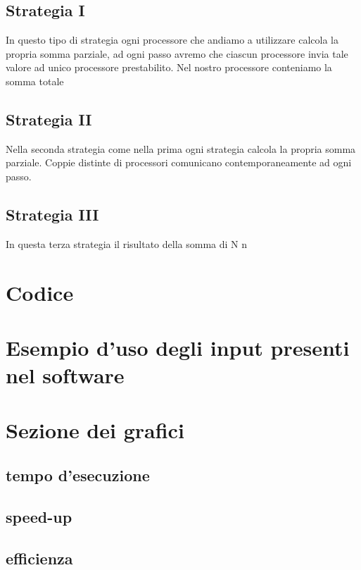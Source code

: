 \documentclass[a4paper,12pt]{article}
\begin{document}
\subsection{Strategia I}

In questo tipo di strategia ogni processore che andiamo a utilizzare calcola la propria somma parziale, ad ogni passo  avremo che ciascun processore invia tale valore ad unico processore prestabilito. Nel nostro processore conteniamo la somma totale

\subsection{Strategia II}

Nella seconda strategia come nella prima ogni strategia calcola la propria somma parziale. Coppie distinte di processori comunicano contemporaneamente ad ogni passo. 


\subsection{Strategia III}

In questa terza strategia il risultato della somma di N n


\section{Codice}



\section{Esempio d'uso degli input presenti nel software}


\section{Sezione dei grafici}
\subsection{tempo d'esecuzione}
\subsection{speed-up}
\subsection{efficienza}
\end{document}
